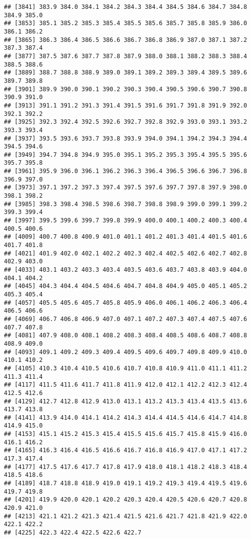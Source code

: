 \documentclass[
]{article}
\begin{document}
\begin{verbatim}
## [3841] 383.9 384.0 384.1 384.2 384.3 384.4 384.5 384.6 384.7 384.8 384.9 385.0
## [3853] 385.1 385.2 385.3 385.4 385.5 385.6 385.7 385.8 385.9 386.0 386.1 386.2
## [3865] 386.3 386.4 386.5 386.6 386.7 386.8 386.9 387.0 387.1 387.2 387.3 387.4
## [3877] 387.5 387.6 387.7 387.8 387.9 388.0 388.1 388.2 388.3 388.4 388.5 388.6
## [3889] 388.7 388.8 388.9 389.0 389.1 389.2 389.3 389.4 389.5 389.6 389.7 389.8
## [3901] 389.9 390.0 390.1 390.2 390.3 390.4 390.5 390.6 390.7 390.8 390.9 391.0
## [3913] 391.1 391.2 391.3 391.4 391.5 391.6 391.7 391.8 391.9 392.0 392.1 392.2
## [3925] 392.3 392.4 392.5 392.6 392.7 392.8 392.9 393.0 393.1 393.2 393.3 393.4
## [3937] 393.5 393.6 393.7 393.8 393.9 394.0 394.1 394.2 394.3 394.4 394.5 394.6
## [3949] 394.7 394.8 394.9 395.0 395.1 395.2 395.3 395.4 395.5 395.6 395.7 395.8
## [3961] 395.9 396.0 396.1 396.2 396.3 396.4 396.5 396.6 396.7 396.8 396.9 397.0
## [3973] 397.1 397.2 397.3 397.4 397.5 397.6 397.7 397.8 397.9 398.0 398.1 398.2
## [3985] 398.3 398.4 398.5 398.6 398.7 398.8 398.9 399.0 399.1 399.2 399.3 399.4
## [3997] 399.5 399.6 399.7 399.8 399.9 400.0 400.1 400.2 400.3 400.4 400.5 400.6
## [4009] 400.7 400.8 400.9 401.0 401.1 401.2 401.3 401.4 401.5 401.6 401.7 401.8
## [4021] 401.9 402.0 402.1 402.2 402.3 402.4 402.5 402.6 402.7 402.8 402.9 403.0
## [4033] 403.1 403.2 403.3 403.4 403.5 403.6 403.7 403.8 403.9 404.0 404.1 404.2
## [4045] 404.3 404.4 404.5 404.6 404.7 404.8 404.9 405.0 405.1 405.2 405.3 405.4
## [4057] 405.5 405.6 405.7 405.8 405.9 406.0 406.1 406.2 406.3 406.4 406.5 406.6
## [4069] 406.7 406.8 406.9 407.0 407.1 407.2 407.3 407.4 407.5 407.6 407.7 407.8
## [4081] 407.9 408.0 408.1 408.2 408.3 408.4 408.5 408.6 408.7 408.8 408.9 409.0
## [4093] 409.1 409.2 409.3 409.4 409.5 409.6 409.7 409.8 409.9 410.0 410.1 410.2
## [4105] 410.3 410.4 410.5 410.6 410.7 410.8 410.9 411.0 411.1 411.2 411.3 411.4
## [4117] 411.5 411.6 411.7 411.8 411.9 412.0 412.1 412.2 412.3 412.4 412.5 412.6
## [4129] 412.7 412.8 412.9 413.0 413.1 413.2 413.3 413.4 413.5 413.6 413.7 413.8
## [4141] 413.9 414.0 414.1 414.2 414.3 414.4 414.5 414.6 414.7 414.8 414.9 415.0
## [4153] 415.1 415.2 415.3 415.4 415.5 415.6 415.7 415.8 415.9 416.0 416.1 416.2
## [4165] 416.3 416.4 416.5 416.6 416.7 416.8 416.9 417.0 417.1 417.2 417.3 417.4
## [4177] 417.5 417.6 417.7 417.8 417.9 418.0 418.1 418.2 418.3 418.4 418.5 418.6
## [4189] 418.7 418.8 418.9 419.0 419.1 419.2 419.3 419.4 419.5 419.6 419.7 419.8
## [4201] 419.9 420.0 420.1 420.2 420.3 420.4 420.5 420.6 420.7 420.8 420.9 421.0
## [4213] 421.1 421.2 421.3 421.4 421.5 421.6 421.7 421.8 421.9 422.0 422.1 422.2
## [4225] 422.3 422.4 422.5 422.6 422.7
\end{verbatim}
\end{document}
